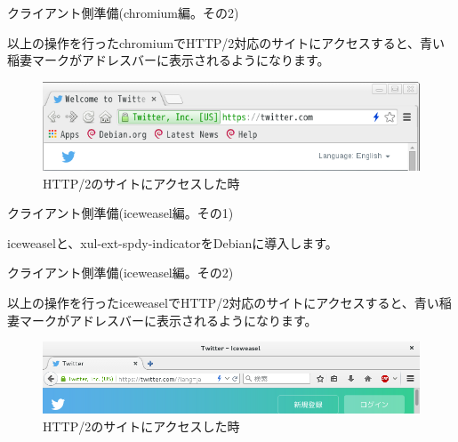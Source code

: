 \begin{frame}{クライアント側準備(chromium編。その2)}

以上の操作を行ったchromiumでHTTP/2対応のサイトにアクセスすると、青い稲妻マークがアドレスバーに表示されるようになります。

\begin{figure}[H]
\begin{center}
 \includegraphics[width=0.9\hsize]{image201507/chromium-http-2-ready.png}
\end{center}
\caption{HTTP/2のサイトにアクセスした時}
\end{figure}

\end{frame}

\begin{frame}[containsverbatim]{クライアント側準備(iceweasel編。その1)}

iceweaselと、xul-ext-spdy-indicatorをDebianに導入します。
  

\end{frame}

\begin{frame}{クライアント側準備(iceweasel編。その2)}

以上の操作を行ったiceweaselでHTTP/2対応のサイトにアクセスすると、青い稲妻マークがアドレスバーに表示されるようになります。

\begin{figure}[H]
\begin{center}
 \includegraphics[width=0.9\hsize]{image201507/iceweasel-http-2-ready.png}
\end{center}
\caption{HTTP/2のサイトにアクセスした時}
\end{figure}
  
\end{frame}

